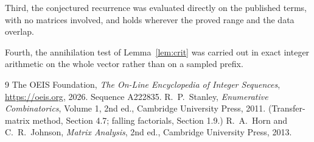 \documentclass[11pt,a4paper]{article}
\theoremstyle{plain}
\theoremstyle{definition}
\begin{document}
Third, the conjectured recurrence was evaluated directly on the published terms, with no
matrices involved, and holds wherever the proved range and the data overlap.

Fourth, the annihilation test of Lemma~\ref{lem:crit} was carried out in exact integer
arithmetic on the whole vector rather than on a sampled prefix.

\begin{thebibliography}{9}
 The OEIS Foundation, \emph{The On-Line Encyclopedia of Integer
Sequences}, \url{https://oeis.org}, 2026. Sequence A222835.
 R.~P.~Stanley, \emph{Enumerative Combinatorics}, Volume 1, 2nd ed.,
Cambridge University Press, 2011. (Transfer-matrix method, Section 4.7; falling factorials,
Section 1.9.)
 R.~A.~Horn and C.~R.~Johnson, \emph{Matrix Analysis}, 2nd ed., Cambridge
University Press, 2013.
\end{thebibliography}
\end{document}

